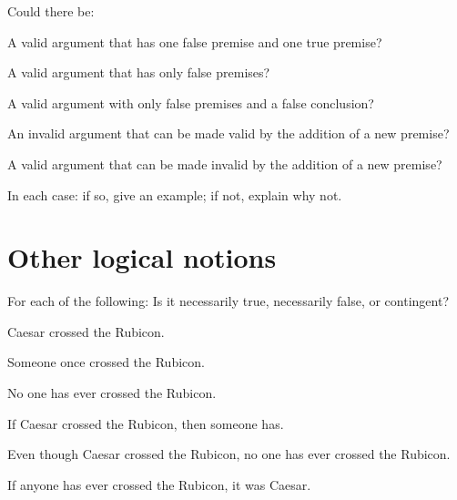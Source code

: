 \problempart
\label{pr.EnglishCombinations}
Could there be:
	\begin{earg}
		\item A valid argument that has one false premise and one true premise? \hfill {}
		\item A valid argument that has only false premises? \hfill {}
		\item A valid argument with only false premises and a false conclusion? \hfill {}
		\item An invalid argument that can be made valid by the addition of a new premise? \hfill{}
		\item A valid argument that can be made invalid by the addition of a new premise? \hfill {}
	\end{earg}
In each case: if so, give an example; if not, explain why not.

\chapter{Other logical notions}
\setcounter{ProbPart}{0}
\problempart
\label{pr.EnglishTautology}
For each of the following: Is it necessarily true, necessarily false, or contingent?
\begin{earg}
\item Caesar crossed the Rubicon.
\hfill {}
\item Someone once crossed the Rubicon.
\hfill {}
\item No one has ever crossed the Rubicon.
\hfill {}
\item If Caesar crossed the Rubicon, then someone has.
\hfill {}
\item Even though Caesar crossed the Rubicon, no one has ever crossed the Rubicon.
\hfill {}
\item If anyone has ever crossed the Rubicon, it was Caesar.
\hfill {}
\end{earg}

